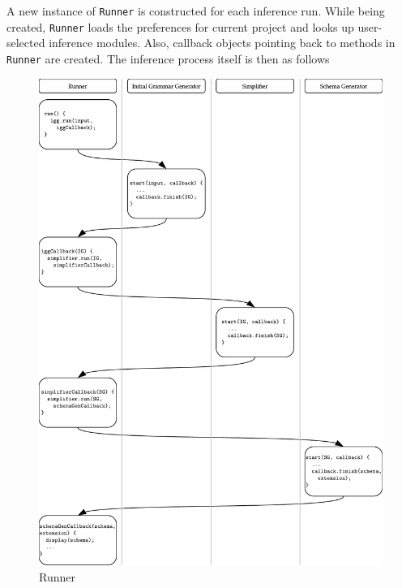 \documentclass[a4paper,10pt,oneside]{article}
\newcommand{\myscale}{0.74}
\newcommand{\code}[1]{\texttt{#1}}
\begin{document}
A new instance of \code{Runner} is constructed for each inference run. While being created, \code{Runner}  loads the preferences for current project and looks up user-selected inference modules. Also, callback objects pointing back to methods in \code{Runner} are created. The inference process itself is then as follows
\begin{figure}
\centering\includegraphics[scale=\myscale]{runner}
\caption{Runner} \label{runner}
\end{figure}
\end{document}
